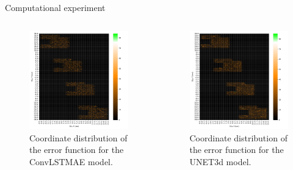 \documentclass{beamer}
\begin{document}
\begin{frame}{Computational experiment}
\begin{columns}[c]
\begin{figure}
    \centering
    \includegraphics[scale=0.23]{lstm_4_window_xy_train_after.pdf}
    \caption{Coordinate distribution of the error function for the ConvLSTMAE model.}
    \label{convlstmae_xy}
\end{figure}

\begin{figure}
    \centering
    \includegraphics[scale=0.23]{unet_xy_train_after.pdf}
    \caption{Coordinate distribution of the error function for the UNET3d model.}
    \label{unet_xy}
\end{figure}
\end{columns}
\end{frame}
\end{document}
